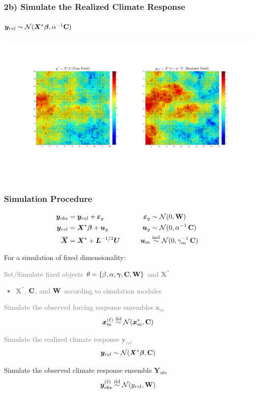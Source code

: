 \documentclass{beamer}
\newcommand{\C}{\ensuremath{\text{Cov}}}
\newcommand{\iid}{\ensuremath{\stackrel{\text{iid}}{\sim}}}
\newcommand{\light}[1]{\textcolor{gray}{#1}}
\def\*#1{\bm{#1}}
\def\C{\textbf{\text{C}}}
\def\W{\textbf{\text{W}}}
\begin{document}

\begin{frame}
\frametitle{2b) Simulate the Realized Climate Response}
\framesubtitle{$\*y_{rel} \sim \mathcal N ( \*X^* \* \beta, \alpha^{-1} \C)$}
\begin{center}
\includegraphics[width=\textwidth]{Images/yprogression.png}
\end{center}
\end{frame}

\begin{frame}
\frametitle{Simulation Procedure}

\begin{block}{}
\vspace*{-\baselineskip}\setlength\belowdisplayshortskip{0pt}
\begin{alignat*}{3}
\*y_{obs} &= \*y_{rel} + \*\varepsilon_y  \qquad \quad &\*\varepsilon_y &\sim \mathcal N(0,\W)\\
\*y_{rel} &= \*X^* \*\beta + \*u_y \nonumber  \qquad  &\*u_y &\sim \mathcal N(0,\alpha^{-1}\,\C) \\
\overline{\*X} &= \*X^* + \*L^{-1/2} \*U \qquad    &\*u_m &\stackrel{\text{ind}}{\sim} \mathcal N(0,\gamma_m^{-1} \, \C)  \:
\end{alignat*}
\end{block}

For a simulation of fixed dimensionality:
\begin{itemize}
\item[\light{1)}] \light{Set/Simulate fixed objects $\theta = \{ \beta, \alpha, \*\gamma , \C, \W \}$ and $\*X^*$
\begin{itemize}
\item \light{$\*X^*$, $\C$, and $\W$ according to simulation modules}
\end{itemize}
}
\item[\light{2a)}] \light{Simulate the observed forcing response ensembles $\*x_m$ 
\[
\*x^{(\ell)}_m \iid \mathcal N ( \*x_m^*, \C)
\]
\item[\light{2b)}] Simulate the realized climate response $\* y_{rel}$
\[
\*y_{rel} \sim \mathcal N ( \*X^* \* \beta, \C)
\]
}
\item[3)] Simulate the observed climate response ensemble $\*Y_{obs}$
\[
\*y_{obs}^{(\ell)} \iid \mathcal N ( y_{rel}, \W)
\]
\end{itemize}
\end{frame}
\end{document}
